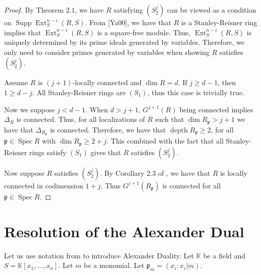\documentclass[11pt]{amsart}
\numberwithin{equation}{section}
\theoremstyle{definition}
\newtheorem{remark}[theorem]{Remark}
\theoremstyle{remark}
\newcommand{\Spec}{\operatorname{Spec}}
\newcommand{\Ext}{\operatorname{Ext}}
\newcommand{\Supp}{\operatorname{Supp}}
\newcommand{\depth}{\operatorname{depth}}
\begin{document}
\begin{proof}
By Theorem $2.1$, we have $R$ satisfying $(S_2^j)$ can be viewed as a condition on $\Supp \Ext _S^{n-i}(R,S)$. From [Ya00], we have that $R$ is a Stanley-Reisner ring implies that $\Ext _S^{n-i}(R, S)$ is a square-free module. Thus, $\Ext _S^{n-i}(R, S)$ is uniquely determined by its prime ideals generated by variables. Therefore, we only need to consider primes generated by variables when showing $R$ satisfies $(S_2^j)$.

Assume $R$ is $(j+1)$-locally connected and $\dim R = d$. If $j \geq d-1$, then $1 \geq d-j$.  All Stanley-Reisner rings are $(S_1)$, thus this case is trivially true.

Now we suppose $j < d-1$. When $d > j+1$, $G^{j+1}(R)$ being connected implies $\Delta_R$ is connected. Thus, for all localizations of $R$ such that $\dim R_\mathfrak{p} > j+1$ we have that $\Delta_{R_{\mathfrak{p}}}$ is connected. Therefore, we have that $\depth R_\mathfrak{p} \geq 2$, for all $\mathfrak{p} \in \Spec R$ with $\dim R_\mathfrak{p} \geq 2+j$. This combined with the fact that all Stanley-Reisner rings satisfy $(S_1)$ gives that $R$ satisfies $(S_2^{j})$.

Now suppose $R$ satisfies $(S_2^{j})$. By Corollary 2.3 of \cite{Ha62}, we have that $R$ is locally connected in codimension $1+j$.  Thus $G^{j+1}(R_\mathfrak{p})$ is connected for all $\mathfrak{p} \in \Spec R$.

\end{proof}

\iffalse
\begin{remark}
We note that the second half of our proof remains true in a far more general setting.
\end{remark}

\begin{remark}
This theorem does not hold in the non-pure case.  Consider the simplicial complex with facets $ABC,CD,EF$.  This complex has a dimension $3$ Stanley-Reisner ring $R$, but is disconnected and thus $R$ does not satisfy $(S_2^1)$.  However, $\bar G^2(R)$ is locally connected.  
\end{remark}
\fi

\section{Resolution of the Alexander Dual}

Let us use notation from \cite{FM14} to introduce Alexander Duality. Let $\mathbb{K}$ be a field and $S=\mathbb{K}[x_1,...,x_n]$.  Let $m$ be a monomial. Let $\mathfrak{p}_m = (x_i : x_i | m)$.
\end{document}
